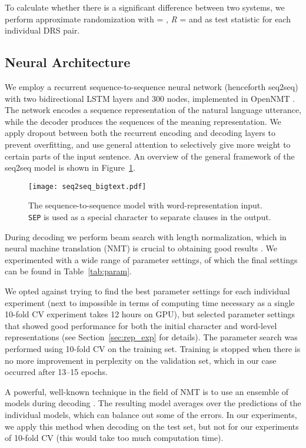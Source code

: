 \documentclass[11pt,a4paper]{article}
\begin{document}
To calculate whether there is a significant difference between two systems, we perform approximate randomization \cite{random-appr:89} with  = , \emph{R} =  and  as test statistic for each individual DRS pair. 

\subsection{Neural Architecture}
\label{sec:parameters}

We employ a recurrent sequence-to-sequence neural network (henceforth seq2seq) with two bidirectional LSTM layers and 300 nodes, implemented in OpenNMT \cite{opennmt:17}.
The network encodes a sequence representation of the natural language utterance, while the decoder produces the sequences of the meaning representation. We apply dropout \cite{dropout:14} between both the recurrent encoding and decoding layers to prevent overfitting, and use general attention \cite{luong15} to selectively give more weight to certain parts of the input sentence. An overview of the general framework of the seq2seq model is shown in Figure~\ref{fig:seq2seq}.

\begin{figure}[!t]
  \centering
  \texttt{[image: seq2seq\_bigtext.pdf]}
  \caption{\label{fig:seq2seq}The sequence-to-sequence model with word-representation input. \texttt{SEP} is used as a special character to separate clauses in the output.}
\end{figure}

During decoding we perform beam search with length normalization, which in neural machine translation (NMT) is crucial to obtaining good results \cite{britz:17}. We experimented with a wide range of parameter settings, of which the final settings can be found in Table~\ref{tab:param}.

We opted against trying to find the best parameter settings for each individual experiment (next to impossible in terms of computing time necessary as a single 10-fold CV experiment takes 12 hours on GPU), but selected parameter settings that showed good performance for both the initial character and word-level representations (see Section~\ref{sec:rep_exp} for details). The parameter search was performed using 10-fold CV on the training set. Training is stopped when there is no more improvement in perplexity on the validation set, which in our case occurred after 13--15 epochs.

A powerful, well-known technique in the field of NMT is to use an ensemble of models during decoding \cite{sutskever:14,sennrich-wmt:16}. The resulting model averages over the predictions of the individual models, which can balance out some of the errors. In our experiments, we apply this method when decoding on the test set, but not for our experiments of 10-fold CV (this would take too much computation time).
\end{document}
